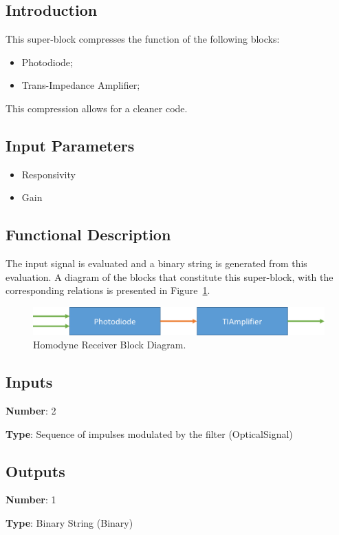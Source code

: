 \documentclass[../../sdf/tex/BPSK_system.tex]{subfiles}
\date{}
\begin{document}
\onlyinsubfile{\maketitle}

\subsection*{Introduction}

This super-block compresses the function of the following blocks:
\begin{itemize}
\item Photodiode;
\item Trans-Impedance Amplifier;
\end{itemize}
\noindent
This compression allows for a cleaner code. 

\subsection*{Input Parameters}

\begin{itemize}
	\item Responsivity
	\item Gain
\end{itemize}

\subsection*{Functional Description}

The input signal is evaluated and a binary string is generated from this evaluation. A diagram of the blocks that constitute this super-block, with the corresponding relations is presented in Figure~\ref{fig:physicalsystem}.

\begin{figure}[H]
\centering
\includegraphics[width=\linewidth]{blockdiagram_reciever.png}
\caption{Homodyne Receiver Block Diagram.}
\label{fig:physicalsystem}
\end{figure}

\subsection*{Inputs}

\textbf{Number}: 2

\textbf{Type}: Sequence of impulses modulated by the filter (OpticalSignal)

\subsection*{Outputs}

\textbf{Number}: 1

\textbf{Type}: Binary String (Binary)
\end{document}
